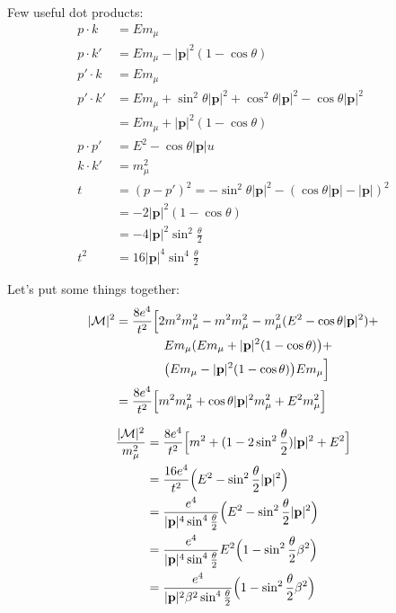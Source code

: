 \documentclass[11pt]{article}
\begin{document}
Few useful dot products:
\begin{equation}
  \begin{split}
    p \cdot k & = E m_\mu \\
    p \cdot k' &= E m_\mu - |\textbf{p}|^2 (1 - \cos \theta) \\
    p' \cdot k &= E m_\mu \\
    p' \cdot k' &=  E m_\mu + \sin^2 \theta |\textbf{p}|^2 +
      \cos^2 \theta |\textbf{p}|^2 -
      \cos \theta |\textbf{p}|^2 \\
      &= E m_\mu + |\textbf{p}|^2 (1 - \cos \theta)\\
    p \cdot p' & = E^2 - \cos \theta |\textbf{p}| u \\
    k \cdot k' & = m_\mu^2 \\
    t & = (p - p')^2 = -\sin^2 \theta |\textbf{p}|^2 -
      (\cos \theta |\textbf{p}| - |\textbf{p}|)^2 \\
      & = -2 |\textbf{p}|^2 (1 - \cos \theta) \\
      & = -4 |\textbf{p}|^2 \sin^2 \frac{\theta} {2} \\
    t^2 & = 16 |\textbf{p}|^4 \sin^4 \frac{\theta} {2}
  \end{split}
\end{equation}

Let's put some things together:
\begin{equation}
  \begin{split}
    |{\cal{M}}|^2 & = \frac{8 e^4}{t^2} \Big [
      2 m^2 m_\mu^2 -
      m^2 m_\mu^2 -
      m_\mu^2 (E^2 - \cos \theta |\textbf{p}|^2) + \\
      & \phantom{=====} E m_\mu
        ( E m_\mu + |\textbf{p}|^2 (1 - \cos \theta) \big ) + \\
      & \phantom{=====} \big ( E m_\mu -
        |\textbf{p}|^2 (1 - \cos \theta) \big ) E m_\mu
      \Big ] \\
    & = \frac{8 e^4}{t^2} \Big [
      m^2 m_\mu^2 + \cos \theta |\textbf{p}|^2 m_\mu^2 + E^2 m_\mu^2 \Big ]
  \end{split}
\end{equation}

\begin{equation}
  \begin{split}
    \frac{|{\cal{M}}|^2} {m_\mu^2} & = \frac{8 e^4}{t^2} \Big [
      m^2 + (1 - 2 \sin^2 \frac{\theta} {2}) |\textbf{p}|^2 + E^2 \Big ] \\
    & = \frac{16 e^4}{t^2} \Big ( E^2 - \sin^2 \frac {\theta} {2}
      |\textbf{p}|^2 \Big ) \\
    & = \frac{e^4}{|\textbf{p}|^4 \sin^4 \frac{\theta} {2}}
      \Big ( E^2 - \sin^2 \frac {\theta} {2} |\textbf{p}|^2 \Big ) \\
    & = \frac{e^4}{|\textbf{p}|^4 \sin^4 \frac{\theta} {2}}
      E^2 \Big ( 1 - \sin^2 \frac {\theta} {2} \beta^2 \Big ) \\
    & = \frac{e^4}{|\textbf{p}|^2 \beta^2 \sin^4 \frac{\theta} {2}}
      \Big ( 1 - \sin^2 \frac {\theta} {2} \beta^2 \Big )
  \end{split}
\end{equation}
\end{document}
